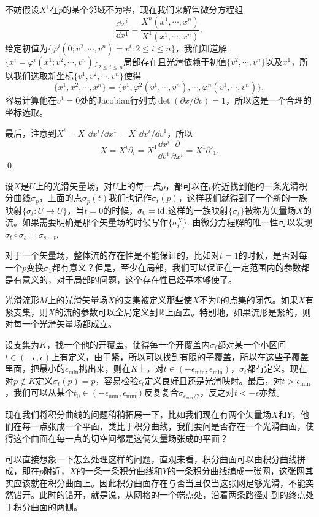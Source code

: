 	不妨假设$X^1$在$p$的某个邻域不为零，现在我们来解常微分方程组
	\[
		\frac{\dd x^i}{\dd x^1}=\frac{X^n(x^1,\cdots,x^n)}{X^1(x^1,\cdots,x^n)},
	\]
	给定初值为$\{\varphi^i(0;v^2,\cdots,v^n)=v^i:2\leq i \leq n\}$，我们知道解$\{x^i=\varphi^i(x^1;v^2,\cdots,v^n)\}_{2\leq i \leq n}$局部存在且光滑依赖于初值$\{v^2,\cdots,v^n\}$以及$x^1$，所以我们选取新坐标$\{v^1,v^2,\cdots,v^n\}$使得
	\[
		\{x^1,x^2,\cdots,x^n\}=\{v^1,\varphi^2(v^1,\cdots,v^n),\cdots,\varphi^n(v^1,\cdots,v^n)\},
	\]
	容易计算他在$v^1=0$处的Jacobian行列式$\det(\partial x/\partial v)=1$，所以这是一个合理的坐标选取。

	最后，注意到$X^i=X^1 \dd x^i/\dd x^1=X^1 \dd x^i/\dd v^1$，所以
	\[
		X=X^i\partial_i=X^1 \frac{\dd x^i}{\dd v^1}\frac{\partial}{\partial x^i}=X^1\partial'_1.
	\]\qed

设$X$是$U$上的光滑矢量场，对$U$上的每一点$p$，都可以在$p$附近找到他的一条光滑积分曲线$\sigma_p$，上面的点$\sigma_p(t)$我们也记作$\sigma_t(p)$，这样我们就得到了一个新的一族映射$\{\sigma_t:U\to U\}$，当$t=0$的时候，$\sigma_0=\operatorname{id}$.这样的一族映射$\{\sigma_t\}$被称为矢量场$X$的{\kaishu 流}。如果需要明确是那个矢量场的时候写作$\{\sigma^X_t\}$. 由微分方程解的唯一性可以发现$\sigma_t\circ \sigma_s=\sigma_{s+t}$.

对于一个矢量场，整体流的存在性是不能保证的，比如对$t=1$的时候，是否对每一个$p$变换$\sigma_1$都有意义？但是，至少在局部，我们可以保证在一定范围内的参数都是有意义的，对于局部的问题，这个存在性已经基本够使了。

\para 光滑流形$M$上的光滑矢量场$X$的支集被定义那些使$X$不为$0$的点集的闭包。如果$X$有紧支集，则$X$的流的参数可以全局定义到$\mathbb{R}$上面去。特别地，如果流形是紧的，则对每一个光滑矢量场都成立。

设支集为$K$，找一个他的开覆盖，使得每一个开覆盖内$\sigma_t$都对某一个小区间$t\in (-\epsilon,\epsilon)$上有定义，由于紧，所以可以找到有限的子覆盖，所以在这些子覆盖里面，把最小的$\epsilon_{\text{min}}$挑出来，则在$K$上，对$t\in(-\epsilon_{\text{min}},\epsilon_{\text{min}})$，$\sigma_t$都有定义。现在对$p\notin K$定义$\sigma_t(p)=p$，容易检验$\epsilon_t$定义良好且还是光滑映射。最后，对$t>\epsilon_{\text{min}}$，我们可以从某个$t_0\in (-\epsilon_{\text{min}},\epsilon_{\text{min}})$反复复合$\sigma_{\epsilon_{\text{min}}/2}$，反之对$t<-\epsilon$亦然。

\para 现在我们将积分曲线的问题稍稍拓展一下，比如我们现在有两个矢量场$X$和$Y$，他们在每一点张成一个平面，类比于积分曲线，我们要问是否存在一个光滑曲面，使得这个曲面在每一点的切空间都是这俩矢量场张成的平面？

可以直接想象一下怎么处理这样的问题，直观来看，积分曲面可以由积分曲线拼成，即在$p$附近，$X$的一条一条积分曲线和$Y$的一条积分曲线编成一张网，这张网其实应该就在积分曲面上。因此积分曲面存在与否当且仅当这张网足够光滑，不能突然错开。此时的错开，就是说，从网格的一个端点处，沿着两条路径走到的终点处于积分曲面的两侧。

